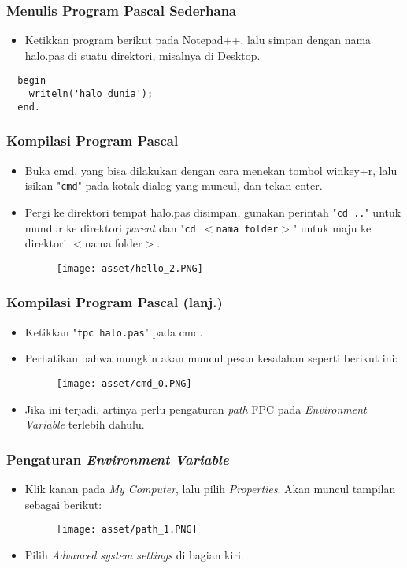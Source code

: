 \begin{frame}[fragile]
\frametitle{Menulis Program Pascal Sederhana}
\begin{itemize}
  \item Ketikkan program berikut pada Notepad++, lalu simpan dengan nama halo.pas di suatu direktori, misalnya di Desktop.
\end{itemize}
\begin{lstlisting}
  begin
    writeln('halo dunia');
  end.
\end{lstlisting}
\end{frame}

\begin{frame}
\frametitle{Kompilasi Program Pascal}
\begin{itemize}
  \item Buka cmd, yang bisa dilakukan dengan cara menekan tombol winkey+r, lalu isikan "\texttt{cmd}" pada kotak dialog yang muncul, dan tekan enter.
  \item Pergi ke direktori tempat halo.pas disimpan, gunakan perintah "\texttt{cd ..}" untuk mundur ke direktori \textit{parent} dan "\texttt{cd $<$nama folder$>$}" untuk maju ke direktori $<$nama folder$>$.
  \begin{figure}
    \texttt{[image: asset/hello\_2.PNG]}
  \end{figure}
\end{itemize}
\end{frame}

\begin{frame}
\frametitle{Kompilasi Program Pascal (lanj.)}
\begin{itemize}
  \item Ketikkan "\texttt{fpc halo.pas}" pada cmd.
  \item Perhatikan bahwa mungkin akan muncul pesan kesalahan seperti berikut ini:
  \begin{figure}
    \texttt{[image: asset/cmd\_0.PNG]}
  \end{figure}
  \item Jika ini terjadi, artinya perlu pengaturan \textit{path} FPC pada \textit{Environment Variable} terlebih dahulu.
\end{itemize}
\end{frame}

\begin{frame}
\frametitle{Pengaturan \textit{Environment Variable}}
\begin{itemize}
  \item Klik kanan pada \textit{My Computer}, lalu pilih \textit{Properties}. Akan muncul tampilan sebagai berikut:
  \begin{figure}
    \texttt{[image: asset/path\_1.PNG]}
  \end{figure}
  \item Pilih \textit{Advanced system settings} di bagian kiri.
\end{itemize}
\end{frame}

